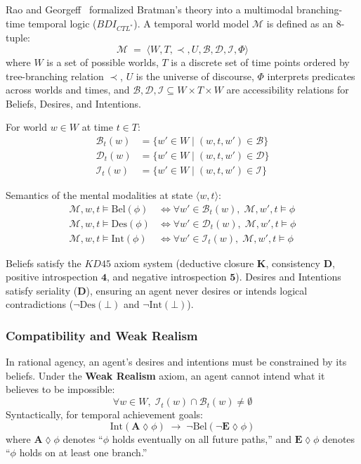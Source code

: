 \documentclass[11pt,a4paper]{article}
\begin{document}
Rao and Georgeff~ formalized Bratman's theory into a multimodal branching-time temporal logic ($BDI_{CTL^*}$). A temporal world model $\mathcal{M}$ is defined as an 8-tuple:
\begin{equation}
\mathcal{M} \;=\; \langle W, T, \prec, U, \mathcal{B}, \mathcal{D}, \mathcal{I}, \Phi \rangle
\end{equation}
where $W$ is a set of possible worlds, $T$ is a discrete set of time points ordered by tree-branching relation $\prec$, $U$ is the universe of discourse, $\Phi$ interprets predicates across worlds and times, and $\mathcal{B}, \mathcal{D}, \mathcal{I} \subseteq W \times T \times W$ are accessibility relations for Beliefs, Desires, and Intentions.

For world $w \in W$ at time $t \in T$:
\begin{align}
\mathcal{B}_t(w) &= \{ w' \in W \mid (w, t, w') \in \mathcal{B} \} \\
\mathcal{D}_t(w) &= \{ w' \in W \mid (w, t, w') \in \mathcal{D} \} \\
\mathcal{I}_t(w) &= \{ w' \in W \mid (w, t, w') \in \mathcal{I} \}
\end{align}

Semantics of the mental modalities at state $\langle w, t \rangle$:
\begin{align}
\mathcal{M}, w, t \models \mathrm{Bel}(\phi) &\iff \forall w' \in \mathcal{B}_t(w), \; \mathcal{M}, w', t \models \phi \\
\mathcal{M}, w, t \models \mathrm{Des}(\phi) &\iff \forall w' \in \mathcal{D}_t(w), \; \mathcal{M}, w', t \models \phi \\
\mathcal{M}, w, t \models \mathrm{Int}(\phi) &\iff \forall w' \in \mathcal{I}_t(w), \; \mathcal{M}, w', t \models \phi
\end{align}

Beliefs satisfy the $KD45$ axiom system (deductive closure $\mathbf{K}$, consistency $\mathbf{D}$, positive introspection $\mathbf{4}$, and negative introspection $\mathbf{5}$). Desires and Intentions satisfy seriality ($\mathbf{D}$), ensuring an agent never desires or intends logical contradictions ($\neg\mathrm{Des}(\bot)$ and $\neg\mathrm{Int}(\bot)$).

\subsubsection{Compatibility and Weak Realism}
In rational agency, an agent's desires and intentions must be constrained by its beliefs. Under the \textbf{Weak Realism} axiom, an agent cannot intend what it believes to be impossible:
\begin{equation}
\forall w \in W, \; \mathcal{I}_t(w) \cap \mathcal{B}_t(w) \neq \emptyset
\end{equation}
Syntactically, for temporal achievement goals:
\begin{equation}
\mathrm{Int}(\mathbf{A}\lozenge \phi) \;\to\; \neg\mathrm{Bel}(\neg\mathbf{E}\lozenge \phi)
\end{equation}
where $\mathbf{A}\lozenge \phi$ denotes ``$\phi$ holds eventually on all future paths,'' and $\mathbf{E}\lozenge \phi$ denotes ``$\phi$ holds on at least one branch.''
\end{document}
